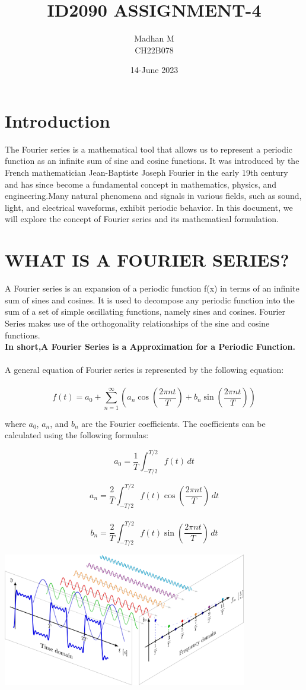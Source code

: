 \documentclass{article}
\title{ID2090 ASSIGNMENT-4}
\author{Madhan M \\CH22B078}
\date{14-June 2023}
\begin{document}
\maketitle

\section{Introduction}
The Fourier series is a mathematical tool that allows us to represent a periodic function as an infinite sum of sine and cosine functions. It was introduced by the French mathematician Jean-Baptiste Joseph Fourier in the early 19th century and has since become a fundamental concept in mathematics, physics, and engineering.Many natural phenomena and signals in various fields, such as sound, light, and electrical waveforms, exhibit periodic behavior. In this document, we will explore the concept of Fourier series and its mathematical formulation.
\section{WHAT IS A FOURIER SERIES?}
 A Fourier series is an expansion of a periodic function f(x) in terms of an infinite sum of sines and cosines. It is used to decompose any periodic function into the sum of a set of simple oscillating functions, namely sines and cosines. Fourier Series makes use of the orthogonality relationships of the sine and cosine functions.\\
  \textbf{In short,A Fourier Series is a Approximation for a Periodic Function.} 
  \\
  \\
  A general equation of Fourier series is represented by the following equation:\\
  \\
\[
f(t) = a_0 + \sum_{n=1}^{\infty} \left(a_n \cos\left(\frac{2\pi n t}{T}\right) + b_n \sin\left(\frac{2\pi n t}{T}\right)\right)
\]

where \(a_0\), \(a_n\), and \(b_n\) are the Fourier coefficients. The coefficients can be calculated using the following formulas:

\[
a_0 = \frac{1}{T} \int_{-T/2}^{T/2} f(t) \, dt
\]

\[
a_n = \frac{2}{T} \int_{-T/2}^{T/2} f(t) \cos\left(\frac{2\pi n t}{T}\right) \, dt
\]
\\
\[
b_n = \frac{2}{T} \int_{-T/2}^{T/2} f(t) \sin\left(\frac{2\pi n t}{T}\right) \, dt
\]

\includegraphics[width=0.8\textwidth]{Fourier2.png}
\\
\end{document}
